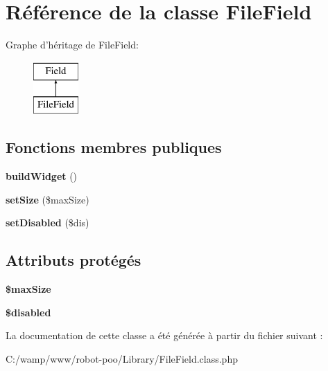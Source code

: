 \hypertarget{class_library_1_1_file_field}{\section{Référence de la classe File\+Field}
\label{class_library_1_1_file_field}
}
Graphe d'héritage de File\+Field\+:\begin{figure}[H]
\begin{center}
\leavevmode
\includegraphics[height=2.000000cm]{class_library_1_1_file_field}
\end{center}
\end{figure}
\subsection*{Fonctions membres publiques}
\begin{DoxyCompactItemize}
\item 
\hypertarget{class_library_1_1_file_field_a3724547eb0ec2b00884571328d7e2d5d}{{\bfseries build\+Widget} ()}\label{class_library_1_1_file_field_a3724547eb0ec2b00884571328d7e2d5d}

\item 
\hypertarget{class_library_1_1_file_field_a7cdf2f9001b0c78da4967ba0cda8c8c4}{{\bfseries set\+Size} (\$max\+Size)}\label{class_library_1_1_file_field_a7cdf2f9001b0c78da4967ba0cda8c8c4}

\item 
\hypertarget{class_library_1_1_file_field_acc543f21e935631a0caa5fe20ac5d7d9}{{\bfseries set\+Disabled} (\$dis)}\label{class_library_1_1_file_field_acc543f21e935631a0caa5fe20ac5d7d9}

\end{DoxyCompactItemize}
\subsection*{Attributs protégés}
\begin{DoxyCompactItemize}
\item 
\hypertarget{class_library_1_1_file_field_a3c08c15291d9d6190bc87540b3e4d11b}{{\bfseries \$max\+Size}}\label{class_library_1_1_file_field_a3c08c15291d9d6190bc87540b3e4d11b}

\item 
\hypertarget{class_library_1_1_file_field_a6c108f5b26242d862f6e51869fbfd271}{{\bfseries \$disabled}}\label{class_library_1_1_file_field_a6c108f5b26242d862f6e51869fbfd271}

\end{DoxyCompactItemize}


La documentation de cette classe a été générée à partir du fichier suivant \+:\begin{DoxyCompactItemize}
\item 
C\+:/wamp/www/robot-\/poo/\+Library/File\+Field.\+class.\+php\end{DoxyCompactItemize}
